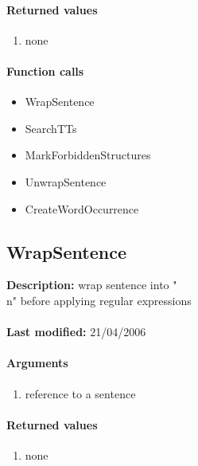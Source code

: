 \paragraph{Returned values}
\begin{enumerate}
\item none
\end{enumerate}

\paragraph{Function calls}
\begin{itemize}
\item WrapSentence
\item SearchTTs
\item MarkForbiddenStructures
\item UnwrapSentence
\item CreateWordOccurrence
\end{itemize}

\subsection{WrapSentence}
\textbf{Description:} wrap sentence into "\\n" before applying regular expressions\\
\\\textbf{Last modified:} 21/04/2006

\paragraph{Arguments}
\begin{enumerate}
\item reference to a sentence
\end{enumerate}

\paragraph{Returned values}
\begin{enumerate}
\item none
\end{enumerate}

